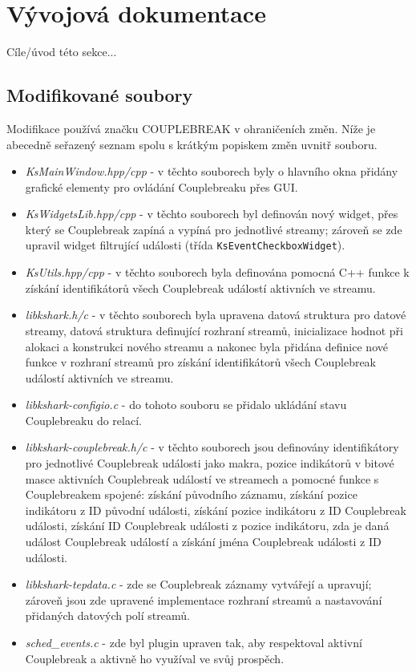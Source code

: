 \section{Vývojová dokumentace}
Cíle/úvod této sekce...

\subsection{Modifikované soubory}
Modifikace používá značku COUPLEBREAK v ohraničeních změn. Níže je abecedně seřazený seznam spolu s krátkým popiskem změn uvnitř souboru.
\begin{itemize}
    \item \emph{KsMainWindow.hpp/cpp} - v těchto souborech byly o hlavního okna přidány grafické elementy pro ovládání Couplebreaku přes GUI.
    \item \emph{KsWidgetsLib.hpp/cpp} - v těchto souborech byl definován nový widget, přes který se Couplebreak zapíná a vypíná pro jednotlivé streamy; zároveň se zde upravil widget filtrující události (třída \verb|KsEventCheckboxWidget|).
    \item \emph{KsUtils.hpp/cpp} - v těchto souborech byla definována pomocná C++ funkce k získání identifikátorů všech Couplebreak událostí aktivních ve streamu.
    \item \emph{libkshark.h/c} - v těchto souborech byla upravena datová struktura pro datové streamy, datová struktura definující rozhraní streamů, inicializace hodnot při alokaci a konstrukci nového streamu a nakonec byla přidána definice nové funkce v rozhraní streamů pro získání identifikátorů všech Couplebreak událostí aktivních ve streamu.
    \item \emph{libkshark-configio.c} - do tohoto souboru se přidalo ukládání stavu Couplebreaku do relací.
    \item \emph{libkshark-couplebreak.h/c} - v těchto souborech jsou definovány identifikátory pro jednotlivé Couplebreak události jako makra, pozice indikátorů v bitové masce aktivních Couplebreak událostí ve streamech a pomocné funkce s Couplebreakem spojené: získání původního záznamu, získání pozice indikátoru z ID původní události, získání pozice indikátoru z ID Couplebreak události, získání ID Couplebreak události z pozice indikátoru, zda je daná událost Couplebreak událostí a získání jména Couplebreak události z ID události.
    \item \emph{libkshark-tepdata.c} - zde se Couplebreak záznamy vytvářejí a upravují; zároveň jsou zde upravené implementace rozhraní streamů a nastavování přidaných datových polí streamů.
    \item \emph{sched\_events.c} - zde byl plugin upraven tak, aby respektoval aktivní Couplebreak a aktivně ho využíval ve svůj prospěch.
\end{itemize}

